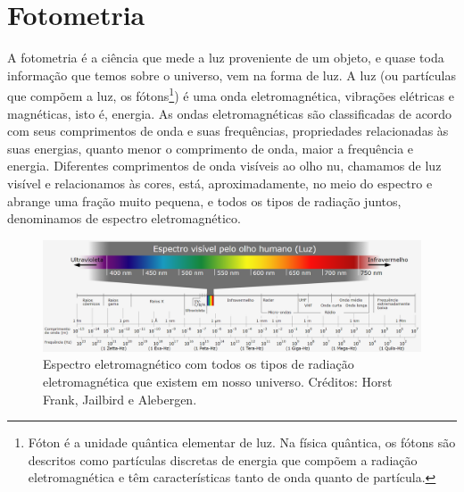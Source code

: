 \chapter{Fotometria}

A fotometria é a ciência que mede a luz proveniente de um objeto, e quase toda informação que temos sobre o universo, vem na forma de luz. A luz  (ou partículas que compõem a luz, os fótons\footnote{Fóton é a unidade quântica elementar de luz. Na física quântica, os fótons são descritos como partículas discretas de energia que compõem a radiação eletromagnética e têm características tanto de onda quanto de partícula.}) é uma onda eletromagnética, vibrações elétricas e magnéticas, isto é, energia. As ondas eletromagnéticas são classificadas de acordo com seus comprimentos de onda e suas frequências, propriedades relacionadas às suas energias, quanto menor o comprimento de onda, maior a frequência e energia. Diferentes comprimentos de onda visíveis ao olho nu, chamamos de luz visível e relacionamos às cores, está, aproximadamente, no meio do espectro e abrange uma fração muito pequena, e todos os tipos de radiação juntos, denominamos de espectro eletromagnético.

\begin{figure}[h]
  \centering 
  \includegraphics[width=1.0\textwidth]{Imagens/espectro.PNG} 
  \caption[Espectro eletromagnético.]{Espectro eletromagnético com todos os tipos de radiação eletromagnética que existem em nosso universo. Créditos: Horst Frank, Jailbird e Alebergen.}
  \label{fig:espectro} 
\end{figure}

